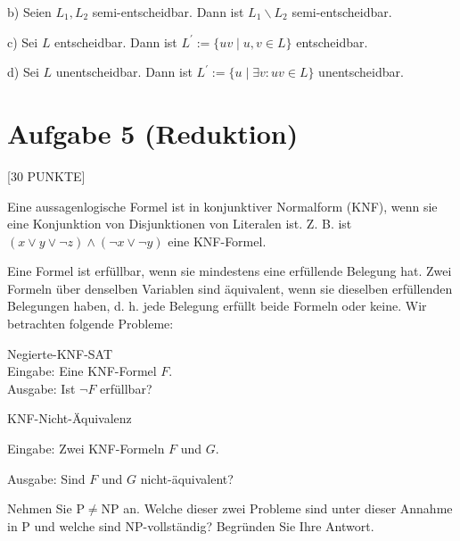 \documentclass[10pt]{article}
\begin{document}
b) Seien $L_{1}, L_{2}$ semi-entscheidbar. Dann ist $L_{1} \backslash L_{2}$ semi-entscheidbar.

c) Sei $L$ entscheidbar. Dann ist $L^{\prime}:=\{u v \mid u, v \in L\}$ entscheidbar.

d) Sei $L$ unentscheidbar. Dann ist $L^{\prime}:=\{u \mid \exists v: u v \in L\}$ unentscheidbar.

\section*{Aufgabe 5 (Reduktion)}
[30 PUNKTE]

Eine aussagenlogische Formel ist in konjunktiver Normalform (KNF), wenn sie eine Konjunktion von Disjunktionen von Literalen ist. Z. B. ist $(x \vee y \vee \neg z) \wedge(\neg x \vee \neg y)$ eine KNF-Formel.

Eine Formel ist erfüllbar, wenn sie mindestens eine erfüllende Belegung hat. Zwei Formeln über denselben Variablen sind äquivalent, wenn sie dieselben erfüllenden Belegungen haben, d. h. jede Belegung erfüllt beide Formeln oder keine. Wir betrachten folgende Probleme:

Negierte-KNF-SAT\\
Eingabe: Eine KNF-Formel $F$.\\
Ausgabe: Ist $\neg F$ erfüllbar?

KNF-Nicht-Äquivalenz

Eingabe: Zwei KNF-Formeln $F$ und $G$.

Ausgabe: Sind $F$ und $G$ nicht-äquivalent?

Nehmen Sie $\mathrm{P} \neq \mathrm{NP}$ an. Welche dieser zwei Probleme sind unter dieser Annahme in $\mathrm{P}$ und welche sind NP-vollständig? Begründen Sie Ihre Antwort.
\end{document}
